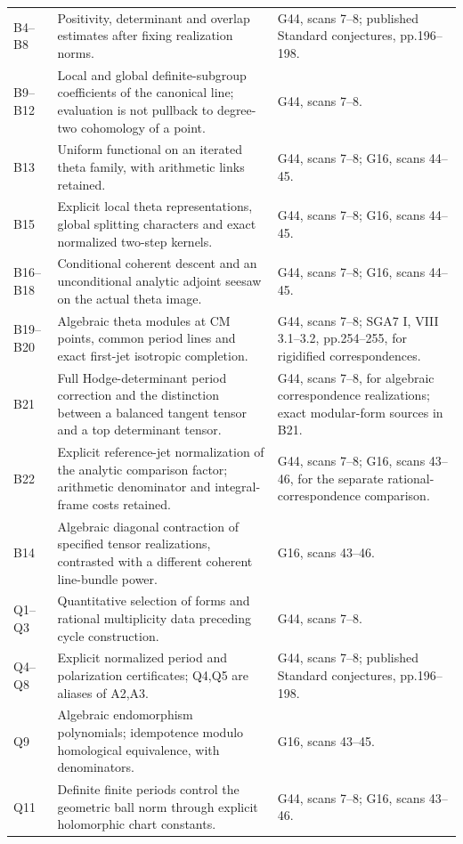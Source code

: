 \documentclass[11pt]{article}
\theoremstyle{definition}\newtheorem{definition}[theorem]{Definition}\newtheorem{remark}[theorem]{Remark}
\begin{document}
\begin{longtable}{@{}p{.18\linewidth}p{.48\linewidth}p{.27\linewidth}@{}}
B4--B8 & Positivity, determinant and overlap estimates after fixing realization norms. & G44, scans 7--8; published Standard conjectures, pp.196--198.\\
B9--B12 & Local and global definite-subgroup coefficients of the canonical line; evaluation is not pullback to degree-two cohomology of a point. & G44, scans 7--8.\\
B13 & Uniform functional on an iterated theta family, with arithmetic links retained. & G44, scans 7--8; G16, scans 44--45.\\
B15 & Explicit local theta representations, global splitting characters and exact normalized two-step kernels. & G44, scans 7--8; G16, scans 44--45.\\
B16--B18 & Conditional coherent descent and an unconditional analytic adjoint seesaw on the actual theta image. & G44, scans 7--8; G16, scans 44--45.\\
B19--B20 & Algebraic theta modules at CM points, common period lines and exact first-jet isotropic completion. & G44, scans 7--8; SGA7 I, VIII 3.1--3.2, pp.254--255, for rigidified correspondences.\\
B21 & Full Hodge-determinant period correction and the distinction between a balanced tangent tensor and a top determinant tensor. & G44, scans 7--8, for algebraic correspondence realizations; exact modular-form sources in B21.\\
B22 & Explicit reference-jet normalization of the analytic comparison factor; arithmetic denominator and integral-frame costs retained. & G44, scans 7--8; G16, scans 43--46, for the separate rational-correspondence comparison.\\
B14 & Algebraic diagonal contraction of specified tensor realizations, contrasted with a different coherent line-bundle power. & G16, scans 43--46.\\
Q1--Q3 & Quantitative selection of forms and rational multiplicity data preceding cycle construction. & G44, scans 7--8.\\
Q4--Q8 & Explicit normalized period and polarization certificates; Q4,Q5 are aliases of A2,A3. & G44, scans 7--8; published Standard conjectures, pp.196--198.\\
Q9 & Algebraic endomorphism polynomials; idempotence modulo homological equivalence, with denominators. & G16, scans 43--45.\\
Q11 & Definite finite periods control the geometric ball norm through explicit holomorphic chart constants. & G44, scans 7--8; G16, scans 43--46.\\

\end{longtable}
\end{document}
